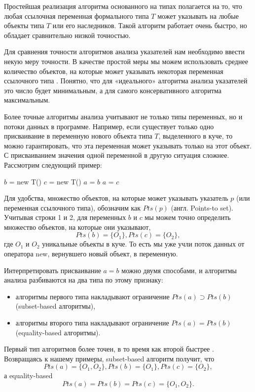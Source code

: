\documentclass[14pt,titlepage]{extarticle}
\newcommand{\eng}[1]{{\English#1}}
\begin{document}
    Простейшая реализация алгоритма основанного на типах полагается на то, что
    любая ссылочная переменная формального типа $T$ может указывать на любые
    объекты типа $T$ или его наследников. Такой алгоритм работает очень быстро,
    но обладает сравнительно низкой точностью.

    Для сравнения точности алгоритмов анализа указателей нам необходимо ввести
    некую меру точности. В качестве простой меры мы можем использовать среднее
    количество объектов, на которые может указывать некоторая переменная
    ссылочного типа \cite{hind_pointer_analysis_not_solved_yet}.
    Понятно, что для «идеального» алгоритма анализа указателей это число будет
    минимальным, а для самого консервативного алгоритма максимальным.

    Более точные алгоритмы анализа учитывают не только типы переменных,
    но и потоки данных в программе. Например, если существует только
    одно присваивание в переменную нового объекта типа $T$, выделенного в куче,
    то можно гарантировать, что эта переменная может указывать только
    на этот объект.
    С присваиванием значения одной переменной в другую ситуация сложнее.
    Рассмотрим следующий пример:
    \begin{algorithmic}[1]
    \STATE $b$ = new T()
    \STATE $c$ = new T()
    \STATE $a$ = $b$
    \STATE $a$ = $c$
    \end{algorithmic}
    Для удобства, множество объектов, на которые может указывать указатель $p$
    (или переменная ссылочного типа), обозначим как $Pts(p)$
    (англ. \eng{Points-to set}).
    Учитывая строки 1 и 2, для переменных $b$ и $c$ мы можем точно определить
    множество объектов, на которые они указывают,
    \[Pts(b) = \{O_1\}, Pts(c) = \{O_2\},\] где $O_1$ и $O_2$ уникальные
    объекты в куче. То есть мы уже учли поток данных от оператора new,
    вернувшего новый объект, в переменную.

    Интерпретировать присваивание $a = b$ можно двумя способами,
    и алгоритмы анализа разбиваются на два типа по этому признаку:
    \begin{itemize}
      \item алгоритмы первого типа накладывают ограничение
            $Pts(a) \supset Pts(b)$ (\eng{subset-based} алгоритмы),
      \item алгоритмы второго типа накладывают ограничение
            $Pts(a) = Pts(b)$ (\eng{equality-based} алгоритмы).
    \end{itemize}
    Первый тип алгоритмов более точен, в то время как второй быстрее
    \cite{steensgaard}. Возвращаясь к нашему примеры, \eng{subset-based}
    алгоритм получит, что
    \[Pts(a) = \{O_1, O_2\}, Pts(b) = \{O_1\}, Pts(c) = \{O_2\},\]
    а \eng{equality-based}
    \[Pts(a) = Pts(b) = Pts(c) = \{O_1, O_2\}.\]
\end{document}
